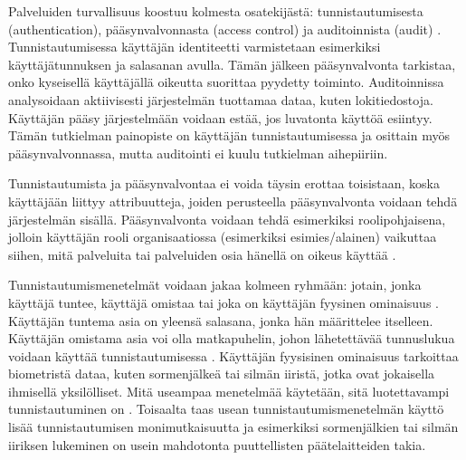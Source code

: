 Palveluiden turvallisuus koostuu kolmesta osatekijästä: tunnistautumisesta (authentication), pääsynvalvonnasta (access control) ja auditoinnista (audit) \cite{sandhu}. Tunnistautumisessa käyttäjän identiteetti varmistetaan esimerkiksi käyttäjätunnuksen ja salasanan avulla. Tämän jälkeen pääsynvalvonta tarkistaa, onko kyseisellä käyttäjällä oikeutta suorittaa pyydetty toiminto. Auditoinnissa analysoidaan aktiivisesti järjestelmän tuottamaa dataa, kuten lokitiedostoja. Käyttäjän pääsy järjestelmään voidaan estää, jos luvatonta käyttöä esiintyy. Tämän tutkielman pai\-no\-pis\-te on käyttäjän tunnistautumisessa ja osittain myös pääsynvalvonnassa, mutta auditointi ei kuulu tutkielman aihepiiriin.

Tunnistautumista ja pääsynvalvontaa ei voida täysin erottaa toisistaan, koska käyttäjään liittyy attribuutteja, joiden perusteella pääsynvalvonta voidaan tehdä järjestelmän sisällä. Pääsynvalvonta voidaan tehdä esimerkiksi roolipohjaisena, jolloin käyttäjän rooli organisaatiossa (esimerkiksi esimies/alainen) vaikuttaa siihen, mitä palveluita tai palveluiden osia hänellä on oikeus käyttää \cite{sandhu_rbac}.

Tunnistautumismenetelmät voidaan jakaa kolmeen ryhmään: jotain, jonka käyttäjä tuntee, käyttäjä omistaa tai joka on käyttäjän fyysinen ominaisuus \cite{nisti}. Käyttäjän tuntema asia on yleensä salasana, jonka hän määrittelee itselleen. Käyttäjän omistama asia voi olla matkapuhelin, johon lähetettävää tunnuslukua voidaan käyttää tunnistautumisessa \cite{5336918}. Käyttäjän fyysisinen ominaisuus tarkoittaa biometristä dataa, kuten sormenjälkeä tai silmän iiristä, jotka ovat jokaisella ihmisellä yksilölliset. Mitä useampaa menetelmää käytetään, sitä luotettavampi tunnistautuminen on \cite{nisti}. Toisaalta taas usean tunnistautumismenetelmän käyttö lisää tunnistautumisen monimutkaisuutta ja esimerkiksi sormenjälkien tai silmän iiriksen lukeminen on usein mahdotonta puuttellisten päätelaitteiden takia.